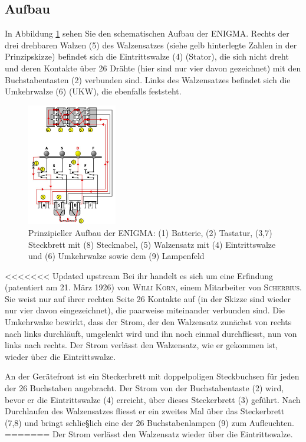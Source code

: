\documentclass[%
<<<<<<< Updated upstream
11pt,%
twoside,%
titlepage,%
german,%
headsepline%
]{scrartcl}
\begin{document}
\subsection{Aufbau}

In Abbildung \ref{abb:enigmaschaltung} sehen Sie den schematischen Aufbau der ENIGMA.
Rechts der drei drehbaren Walzen (5) des Walzensatzes (siehe gelb hinterlegte Zahlen in der Prinzipskizze) befindet sich die Eintrittswalze (4) (Stator), die sich nicht dreht und deren Kontakte über 26 Drähte (hier sind nur vier davon gezeichnet) mit den Buchstabentasten (2) verbunden sind. Links des Walzensatzes befindet sich die Umkehrwalze (6) (UKW), die ebenfalls feststeht.
\begin{figure}
\begin{center}
\includegraphics[width=0.35\textwidth]{pictures/enigmaschaltung.jpg}
\caption{Prinzipieller Aufbau der ENIGMA: (1) Batterie, (2) Tastatur, (3,7) Steckbrett mit (8) Stecknabel, (5) Walzensatz mit (4) Eintrittswalze und (6) Umkehrwalze sowie dem (9) Lampenfeld}\label{abb:enigmaschaltung}
\end{center}
\end{figure}
<<<<<<< Updated upstream
Bei ihr handelt es sich um eine Erfindung (patentiert am 21. März 1926) von \textsc{Willi Korn}, einem Mitarbeiter von \textsc{Scherbius}. Sie weist nur auf ihrer rechten Seite 26 Kontakte auf (in der Skizze sind wieder nur vier davon eingezeichnet), die paarweise miteinander verbunden sind. Die Umkehrwalze bewirkt, dass der Strom, der den Walzensatz zunächst von rechts nach links durchläuft, umgelenkt wird und ihn noch einmal durchfliesst, nun von links nach rechts. Der Strom verlässt den Walzensatz, wie er gekommen ist, wieder über die Eintrittswalze.

An der Gerätefront ist ein Steckerbrett mit doppelpoligen Steckbuchsen für jeden der 26 Buchstaben angebracht. Der Strom von der Buchstabentaste (2) wird, bevor er die Eintrittswalze (4) erreicht, über dieses Steckerbrett (3) geführt. Nach Durchlaufen des Walzensatzes fliesst er ein zweites Mal über das Steckerbrett (7,8) und bringt schlie§lich eine der 26 Buchstabenlampen (9) zum Aufleuchten.
=======
Der Strom verlässt den Walzensatz wieder über die Eintrittswalze.
\end{document}
